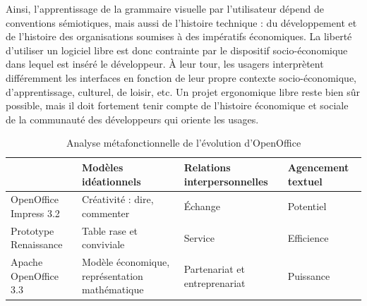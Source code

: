 \documentclass{FramateX}
\begin{document}
\begin{refsection}
Ainsi, l'apprentissage de la grammaire visuelle par l'utilisateur dépend
de conventions sémiotiques, mais aussi de l'histoire technique : du
développement et de l'histoire des organisations soumises à des
impératifs économiques. La liberté d'utiliser un logiciel libre est
donc contrainte par le dispositif socio-économique dans lequel est
inséré le développeur. À leur tour, les usagers interprètent
différemment les interfaces en fonction de leur propre contexte
socio-économique, d'apprentissage, culturel, de loisir, etc. Un projet
ergonomique libre reste bien sûr possible, mais il doit fortement tenir
compte de l'histoire économique et sociale de la communauté des
développeurs qui oriente les usages.

\begin{table}
\begin{scriptsize}
\begin{tabularx}{10cm}{|p{2cm}|p{2cm}|p{2.5cm}|X|}
\hline 
~ & \textbf{Modèles idéationnels}  & \textbf{Relations interpersonnelles}  & \textbf{Agencement textuel} \\
\hline 
OpenOffice Impress 3.2  & Créativité : dire, commenter  & Échange  & Potentiel \\
\hline 
Prototype Renaissance  & Table rase et conviviale  & Service  & Efficience \\
\hline 
Apache OpenOffice 3.3  & Modèle économique, représentation mathématique  & Partenariat et entreprenariat  & Puissance \\
\hline 
\end{tabularx} 
\end{scriptsize}
\caption{Analyse métafonctionnelle de l'évolution d'OpenOffice}
\end{table}




\end{refsection}
\end{document}
